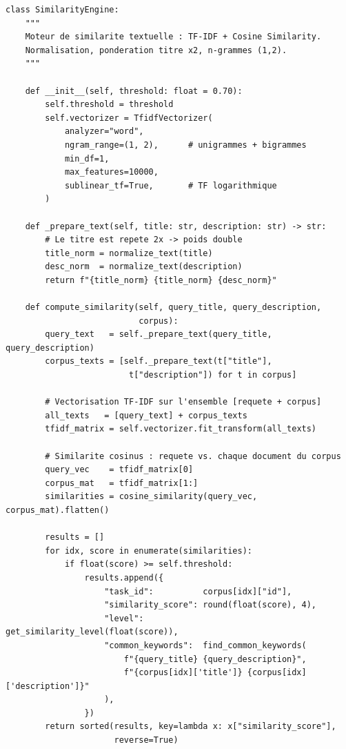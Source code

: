 \documentclass[12pt, a4paper]{article}
\begin{document}
\begin{lstlisting}[caption={Implémentation du moteur TF-IDF + Cosine Similarity (extrait)}, label=lst:engine]
class SimilarityEngine:
    """
    Moteur de similarite textuelle : TF-IDF + Cosine Similarity.
    Normalisation, ponderation titre x2, n-grammes (1,2).
    """

    def __init__(self, threshold: float = 0.70):
        self.threshold = threshold
        self.vectorizer = TfidfVectorizer(
            analyzer="word",
            ngram_range=(1, 2),      # unigrammes + bigrammes
            min_df=1,
            max_features=10000,
            sublinear_tf=True,       # TF logarithmique
        )

    def _prepare_text(self, title: str, description: str) -> str:
        # Le titre est repete 2x -> poids double
        title_norm = normalize_text(title)
        desc_norm  = normalize_text(description)
        return f"{title_norm} {title_norm} {desc_norm}"

    def compute_similarity(self, query_title, query_description,
                           corpus):
        query_text   = self._prepare_text(query_title, query_description)
        corpus_texts = [self._prepare_text(t["title"],
                         t["description"]) for t in corpus]

        # Vectorisation TF-IDF sur l'ensemble [requete + corpus]
        all_texts   = [query_text] + corpus_texts
        tfidf_matrix = self.vectorizer.fit_transform(all_texts)

        # Similarite cosinus : requete vs. chaque document du corpus
        query_vec    = tfidf_matrix[0]
        corpus_mat   = tfidf_matrix[1:]
        similarities = cosine_similarity(query_vec, corpus_mat).flatten()

        results = []
        for idx, score in enumerate(similarities):
            if float(score) >= self.threshold:
                results.append({
                    "task_id":          corpus[idx]["id"],
                    "similarity_score": round(float(score), 4),
                    "level":            get_similarity_level(float(score)),
                    "common_keywords":  find_common_keywords(
                        f"{query_title} {query_description}",
                        f"{corpus[idx]['title']} {corpus[idx]['description']}"
                    ),
                })
        return sorted(results, key=lambda x: x["similarity_score"],
                      reverse=True)
\end{lstlisting}
\end{document}
